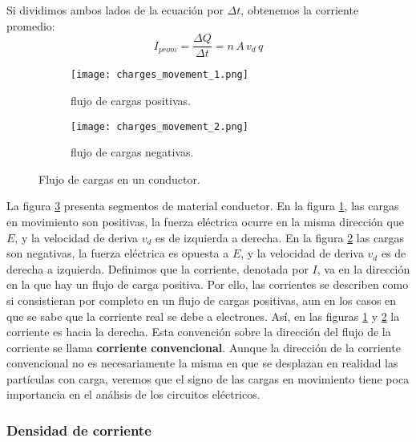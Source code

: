 Si dividimos ambos lados de la ecuación por \(\Delta t\), obtenemos la corriente promedio:
\[
    I_{prom} = \frac{\Delta Q}{\Delta t} = n \, A \, v_d \, q
\]

\begin{figure}[ht]
    \centering
    \begin{subfigure}[b]{0.4\textwidth}
        \centering
        \texttt{[image: charges\_movement\_1.png]}
        \caption{flujo de cargas positivas.}
        \label{fig:flujo_de_cargas_positivas}
    \end{subfigure}
    \hspace{10pt}
    \begin{subfigure}[b]{0.4\textwidth}
        \centering
        \texttt{[image: charges\_movement\_2.png]}
        \caption{flujo de cargas negativas.}
        \label{fig:flujo_de_cargas_negativas}
    \end{subfigure}
    \caption{Flujo de cargas en un conductor.}
    \label{fig:flujo_de_cargas}
\end{figure}

La figura \ref{fig:flujo_de_cargas} presenta segmentos de material conductor. En la figura \ref{fig:flujo_de_cargas_positivas}, las cargas en movimiento son positivas, la fuerza eléctrica ocurre en la misma dirección que \(E\), y la velocidad de deriva \(v_d\) es de izquierda a derecha. En la figura \ref{fig:flujo_de_cargas_negativas} las cargas son negativas, la fuerza eléctrica es opuesta a \(E\), y la velocidad de deriva \(v_d\) es de derecha a izquierda. Definimos que la corriente, denotada por \(I\), va en la dirección en la que hay un flujo de carga positiva. Por ello, las corrientes se describen como si consistieran por completo en un flujo de cargas positivas, aun en los casos en que se sabe que la corriente real se debe a electrones. Así, en las figuras \ref{fig:flujo_de_cargas_positivas} y \ref{fig:flujo_de_cargas_negativas} la corriente es hacia la derecha. Esta convención sobre la dirección del flujo de la corriente se llama \textbf{corriente convencional}. Aunque la dirección de la corriente convencional no es necesariamente la misma en que se desplazan en realidad las partículas con carga, veremos que el signo de las cargas en movimiento tiene poca importancia en el análisis de los circuitos eléctricos.

\subsubsection{Densidad de corriente}

